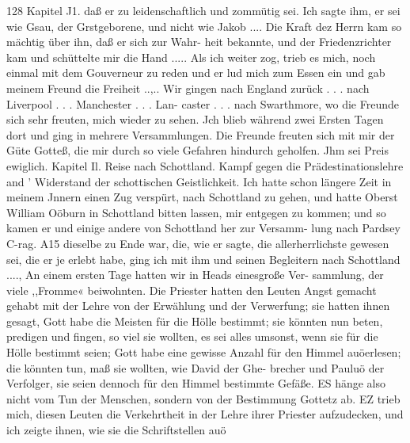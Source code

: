 128 Kapitel J1.
daß er zu leidenschaftlich und zommütig sei. Ich sagte ihm, er
sei wie Gsau, der Grstgeborene, und nicht wie Jakob .... Die
Kraft dez Herrn kam so mächtig über ihn, daß er sich zur Wahr-
heit bekannte, und der Friedenzrichter kam und schüttelte mir
die Hand ..... Als ich weiter zog, trieb es mich, noch einmal
mit dem Gouverneur zu reden und er lud mich zum Essen ein
und gab meinem Freund die Freiheit ..,.. Wir gingen nach
England zurück . . . nach Liverpool . . . Manchester . . . Lan-
caster . . . nach Swarthmore, wo die Freunde sich sehr freuten,
mich wieder zu sehen. Jch blieb während zwei Ersten Tagen
dort und ging in mehrere Versammlungen. Die Freunde freuten
sich mit mir der Güte Gotteß, die mir durch so viele Gefahren
hindurch geholfen. Jhm sei Preis ewiglich.
Kapitel Il.
Reise nach Schottland. Kampf gegen die Prädestinationslehre and '
Widerstand der schottischen Geistlichkeit.
Ich hatte schon längere Zeit in meinem Jnnern einen Zug
verspürt, nach Schottland zu gehen, und hatte Oberst William
Oöburn in Schottland bitten lassen, mir entgegen zu kommen; und
so kamen er und einige andere von Schottland her zur Versamm-
lung nach Pardsey C-rag. A15 dieselbe zu Ende war, die, wie
er sagte, die allerherrlichste gewesen sei, die er je erlebt habe,
ging ich mit ihm und seinen Begleitern nach Schottland ....,
An einem ersten Tage hatten wir in Heads einesgroße Ver-
sammlung, der viele ,,Fromme« beiwohnten. Die Priester hatten
den Leuten Angst gemacht gehabt mit der Lehre von der Erwählung
und der Verwerfung; sie hatten ihnen gesagt, Gott habe die Meisten
für die Hölle bestimmt; sie könnten nun beten, predigen und fingen,
so viel sie wollten, es sei alles umsonst, wenn sie für die Hölle
bestimmt seien; Gott habe eine gewisse Anzahl für den Himmel
auöerlesen; die könnten tun, maß sie wollten, wie David der Ghe-
brecher und Pauluö der Verfolger, sie seien dennoch für den
Himmel bestimmte Gefäße. ES hänge also nicht vom Tun der
Menschen, sondern von der Bestimmung Gottetz ab. EZ trieb
mich, diesen Leuten die Verkehrtheit in der Lehre ihrer Priester
aufzudecken, und ich zeigte ihnen, wie sie die Schriftstellen auö


